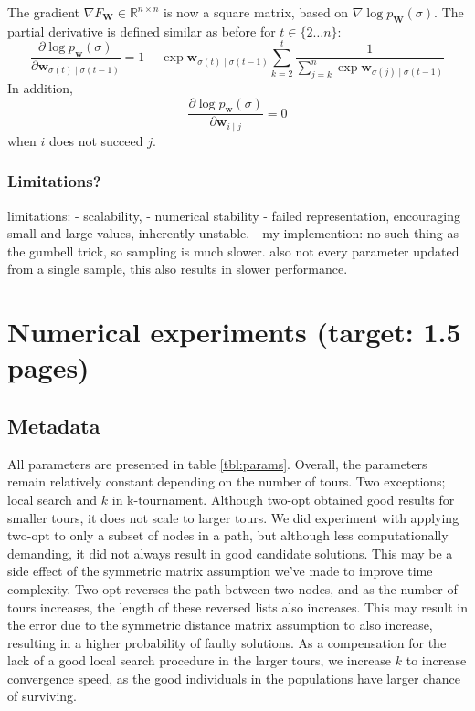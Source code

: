 \documentclass[a4paper,10pt]{article}
\newcommand{\matr}[1]{\mathbf{#1}}
\newcommand{\RemoveMe}[1]{{\color{purple}#1}}
\begin{document}
	The gradient $\nabla F_\mathbf{\matr{W}} \in \mathbb{R}^{n\times n}$ is now a square matrix, based on $\nabla \log p_\matr{W}(\sigma)$. The partial derivative is defined similar as before for $t \in \{ 2 \dots n \}$:
	$$
	\frac{\partial \log p_\mathbf{w}(\sigma)}{\partial \matr{w}_{\sigma(t) \mid \sigma(t-1)}} = 1-\exp \matr{w}_{\sigma(t) \mid \sigma(t - 1)} \sum_{k=2}^t \frac{1}{\sum_{j=k}^n \exp \matr{w}_{\sigma(j) \mid \sigma(t - 1)}}
	$$
	In addition,
	$$
	\frac{\partial \log p_\mathbf{w}(\sigma)}{\partial \matr{w}_{i \mid j}} = 0
	$$
	when $i$ does not succeed $j$.
	
	\subsubsection{Limitations?}
	
	limitations:
	- scalability,
	- numerical stability
	- failed representation, encouraging small and large values, inherently unstable.	
	- my implemention: no such thing as the gumbell trick, so sampling is much slower. also not every parameter updated from a single sample, this also results in slower performance.
	

\section{Numerical experiments (target: 1.5 pages)}

\subsection{Metadata}
	All parameters are presented in table \ref{tbl:params}. Overall, the parameters remain relatively constant depending on the number of tours. Two exceptions; local search and $k$ in k-tournament. Although two-opt obtained good results for smaller tours, it does not scale to larger tours. We did experiment with applying two-opt to only a subset of nodes in a path, but although less computationally demanding, it did not always result in good candidate solutions. This may be a side effect of the symmetric matrix assumption we've made to improve time complexity. Two-opt reverses the path between two nodes, and as the number of tours increases, the length of these reversed lists also increases. This may result in the error due to the symmetric distance matrix assumption to also increase, resulting in a higher probability of faulty solutions. As a compensation for the lack of a good local search procedure in the larger tours, we increase $k$ to increase convergence speed, as the good individuals in the populations have larger chance of surviving.
\end{document}
